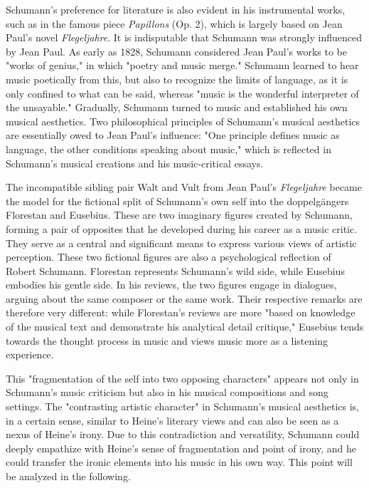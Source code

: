 \documentclass[10pt,a4paper,twocolumn]{rho}
\begin{document}
Schumann's preference for literature is also evident in his instrumental works, such as in the famous piece \textit{Papillons} (Op. 2), which is largely based on Jean Paul's novel \textit{Flegeljahre}. It is indisputable that Schumann was strongly influenced by Jean Paul. As early as 1828, Schumann considered Jean Paul's works to be "works of genius," in which "poetry and music merge." Schumann learned to hear music poetically from this, but also to recognize the limits of language, as it is only confined to what can be said, whereas "music is the wonderful interpreter of the unsayable." Gradually, Schumann turned to music and established his own musical aesthetics. Two philosophical principles of Schumann's musical aesthetics are essentially owed to Jean Paul's influence: "One principle defines music as language, the other conditions speaking about music," which is reflected in Schumann's musical creations and his music-critical essays.

The incompatible sibling pair Walt and Vult from Jean Paul's \textit{Flegeljahre} became the model for the fictional split of Schumann's own self into the doppelgängers Florestan and Eusebius. These are two imaginary figures created by Schumann, forming a pair of opposites that he developed during his career as a music critic. They serve as a central and significant means to express various views of artistic perception. These two fictional figures are also a psychological reflection of Robert Schumann. Florestan represents Schumann's wild side, while Eusebius embodies his gentle side. In his reviews, the two figures engage in dialogues, arguing about the same composer or the same work. Their respective remarks are therefore very different: while Florestan's reviews are more "based on knowledge of the musical text and demonstrate his analytical detail critique," Eusebius tends towards the thought process in music and views music more as a listening experience.

This "fragmentation of the self into two opposing characters" appears not only in Schumann's music criticism but also in his musical compositions and song settings. The "contrasting artistic character" in Schumann's musical aesthetics is, in a certain sense, similar to Heine's literary views and can also be seen as a nexus of Heine's irony. Due to this contradiction and versatility, Schumann could deeply empathize with Heine's sense of fragmentation and point of irony, and he could transfer the ironic elements into his music in his own way. This point will be analyzed in the following.
\end{document}

